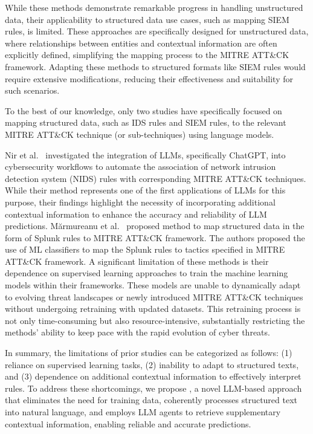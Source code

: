 While these methods demonstrate remarkable progress in handling unstructured data, their applicability to structured data use cases, such as mapping SIEM rules, is limited. 
These approaches are specifically designed for unstructured data, where relationships between entities and contextual information are often explicitly defined, simplifying the mapping process to the MITRE ATT\&CK framework. 
Adapting these methods to structured formats like SIEM rules would require extensive modifications, reducing their effectiveness and suitability for such scenarios.

To the best of our knowledge, only two studies have specifically focused on mapping structured data, such as IDS rules and SIEM rules, to the relevant MITRE ATT\&CK technique (or sub-techniques) using language models.

Nir et al.~\cite{daniel2023labeling} investigated the integration of LLMs, specifically ChatGPT, into cybersecurity workflows to automate the association of network intrusion detection system (NIDS) rules with corresponding MITRE ATT\&CK techniques. 
While their method represents one of the first applications of LLMs for this purpose, their findings highlight the necessity of incorporating additional contextual information to enhance the accuracy and reliability of LLM predictions.
Mărmureanu et al.~\cite{10398612} proposed method to map structured data in the form of Splunk rules to MITRE ATT\&CK framework.
The authors proposed the use of ML classifiers to map the Splunk rules to tactics specified in MITRE ATT\&CK framework.
A significant limitation of these methods is their dependence on supervised learning approaches to train the machine learning models within their frameworks. 
These models are unable to dynamically adapt to evolving threat landscapes or newly introduced MITRE ATT\&CK techniques without undergoing retraining with updated datasets. 
This retraining process is not only time-consuming but also resource-intensive, substantially restricting the methods' ability to keep pace with the rapid evolution of cyber threats.

In summary, the limitations of prior studies can be categorized as follows: (1) reliance on supervised learning tasks, (2) inability to adapt to structured texts, and (3) dependence on additional contextual information to effectively interpret rules. To address these shortcomings, we propose \methodName, a novel LLM-based approach that eliminates the need for training data, coherently processes structured text into natural language, and employs LLM agents to retrieve supplementary contextual information, enabling reliable and accurate predictions.


